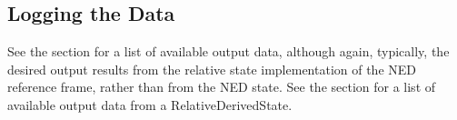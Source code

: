 \subsection{Logging the Data}
See the  section for a list of available output data, although again, typically, the desired output results from the relative state implementation of the NED reference frame, rather than from the NED state.  See the  section for a list of available output data from a RelativeDerivedState.
